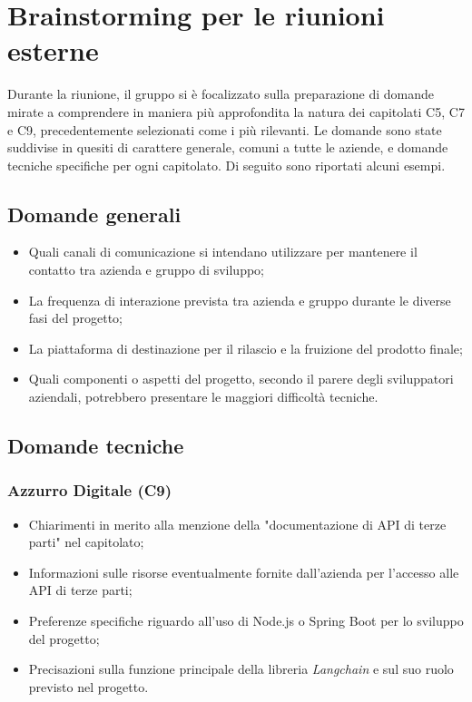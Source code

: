 \documentclass[a4paper, 12pt]{article}
\begin{document}
\section{Brainstorming per le riunioni esterne}
Durante la riunione, il gruppo si è focalizzato sulla preparazione di domande mirate a comprendere in maniera più approfondita la natura dei capitolati C5, C7 e C9, precedentemente selezionati come i più rilevanti. Le domande sono state suddivise in quesiti di carattere generale, comuni a tutte le aziende, e domande tecniche specifiche per ogni capitolato. Di seguito sono riportati alcuni esempi.

\subsection{Domande generali}
\begin{itemize}
    \item Quali canali di comunicazione si intendano utilizzare per mantenere il contatto tra azienda e gruppo di sviluppo;
    \item La frequenza di interazione prevista tra azienda e gruppo durante le diverse fasi del progetto;
    \item La piattaforma di destinazione per il rilascio e la fruizione del prodotto finale;
    \item Quali componenti o aspetti del progetto, secondo il parere degli sviluppatori aziendali, potrebbero presentare le maggiori difficoltà tecniche.
\end{itemize}

\subsection{Domande tecniche}
\subsubsection{Azzurro Digitale (C9)}
\begin{itemize}
    \item Chiarimenti in merito alla menzione della "documentazione di API di terze parti" nel capitolato;
    \item Informazioni sulle risorse eventualmente fornite dall'azienda per l'accesso alle API di terze parti;
    \item Preferenze specifiche riguardo all'uso di Node.js o Spring Boot per lo sviluppo del progetto;
    \item Precisazioni sulla funzione principale della libreria \textit{Langchain} e sul suo ruolo previsto nel progetto.
\end{itemize}
\end{document}
